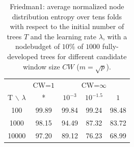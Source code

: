\documentclass{article}
\begin{document}
\begin{table}[t]
\caption{Friedman1: average normalized node distribution entropy over tens folds
with respect to the initial number of trees $T$ and the learning rate 
$\lambda$, with a nodebudget of $10\%$ of $1000$ fully-developed trees for 
different candidate window size $CW$ ($m=\sqrt{p}$).}
\label{tab:poolsizeEntropy}
\begin{center}
\begin{small}
\begin{tabular}{c|c|ccc}
\hline
 & CW=$1$ & \multicolumn{3}{c}{CW=$\infty$} \\
T $\backslash$ $\lambda$ & * & $10^{-3}$ & $10^{-1.5}$ & $1$ \\
\hline
100 & 99.89 & 99.84 & 99.24 & 98.48 \\
1000 & 98.15 & 94.49 & 87.32 & 83.72 \\
10000 & 97.20 & 89.12 & 76.23 & 68.99 \\
\hline
\end{tabular}
\end{small}
\end{center}
\vskip -0.1in
\end{table}
\end{document}
